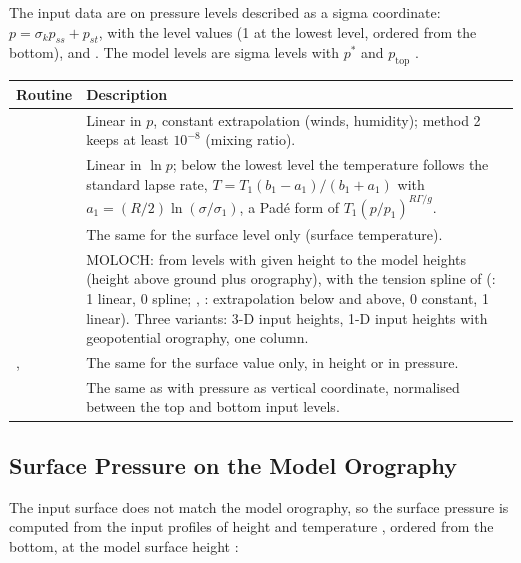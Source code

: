 The input data are on pressure levels described as a sigma coordinate:
$p = \sigma_k p_{ss} + p_{st}$, with  the level values (1 at the
lowest level, ordered from the bottom),  and . The model
levels are sigma levels  with $p^*$  and
$p_\text{top}$ .

\begin{longtable}{L{4.5cm} L{9.5cm}}
  \toprule
  \textbf{Routine} & \textbf{Description} \\
  \midrule
  \endhead
  \bottomrule
  \endfoot
   &
    Linear in $p$, constant extrapolation (winds, humidity); method 2
    keeps at least $10^{-8}$ (mixing ratio). \\
   &
    Linear in $\ln p$; below the lowest level the temperature follows the
    standard lapse rate, $T = T_1(b_1 - a_1)/(b_1 + a_1)$ with
    $a_1 = (R/2)\ln(\sigma/\sigma_1)$, a Pad\'e form of
    $T_1(p/p_1)^{R\Gamma/g}$. \\
   &
    The same for the surface level only (surface temperature). \\
   &
    MOLOCH: from levels with given height to the model heights (height
    above ground plus orography), with the tension spline of
     (: 1 linear, 0 spline; , :
    extrapolation below and above, 0 constant, 1 linear). Three variants:
    3-D input heights, 1-D input heights with geopotential orography, one
    column. \\
  ,  &
    The same for the surface value only, in height or in pressure. \\
   &
    The same as  with pressure as vertical coordinate,
    normalised between the top and bottom input levels. \\
\end{longtable}

\subsection{Surface Pressure on the Model Orography}
\label{subsec:vertint_ps}

The input surface does not match the model orography, so the surface
pressure is computed from the input profiles of height  and
temperature , ordered from the bottom, at the model surface height
:


